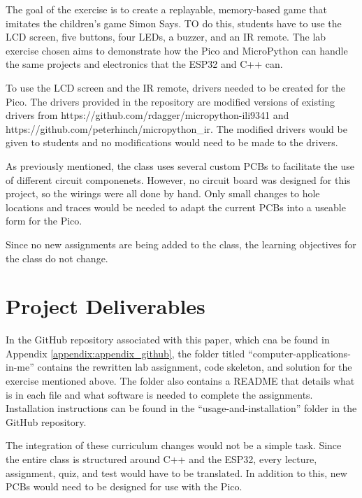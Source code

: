 The goal of the exercise is to create a replayable, memory-based game that imitates the
children's game Simon Says. TO do this, students have to use the LCD screen, five 
buttons, four LEDs, a buzzer, and an IR remote. The lab exercise chosen aims to 
demonstrate how the Pico and MicroPython can handle the same projects and electronics 
that the ESP32 and C++ can. 

To use the LCD screen and the IR remote, drivers needed to be created for the Pico. 
The drivers provided in the repository are modified versions of
existing drivers from https://github.com/rdagger/micropython-ili9341 and 
https://github.com/peterhinch/micropython\_ir. The modified drivers would be given to 
students and no modifications would need to be made to the drivers. 

As previously mentioned, the class uses several custom PCBs to facilitate the use
of different circuit componenets. However, no circuit board was designed for this 
project, so the wirings were all done by hand. Only small changes to hole locations
and traces would be needed to adapt the current PCBs into a useable form for the Pico.

Since no new assignments are being added to the class, the learning objectives for the 
class do not change.

\section{Project Deliverables}

In the GitHub repository associated with this paper, which cna be found in Appendix
\ref{appendix:appendix_github}, the folder titled ``computer-applications-in-me'' 
contains the rewritten lab assignment, code skeleton, and solution for the exercise
mentioned above. The folder also contains a README that details what is in each file
and what software is needed to complete the assignments. Installation instructions can
be found in the ``usage-and-installation'' folder in the GitHub repository.

The integration of these curriculum changes would not be a simple task. Since the 
entire class is structured around C++ and the ESP32, every lecture, assignment, quiz,
and test would have to be translated. In addition to this, new PCBs would need to be 
designed for use with the Pico. 

